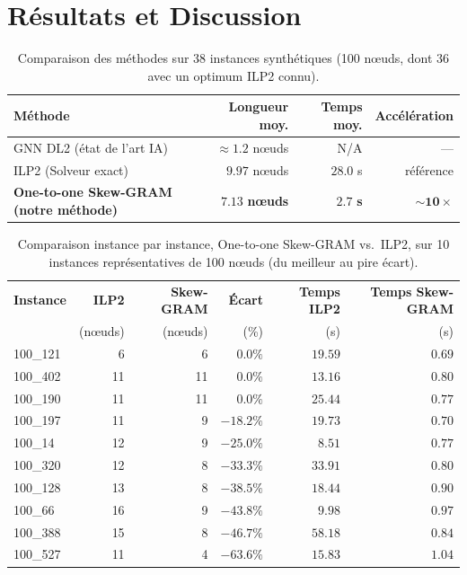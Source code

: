 \documentclass{llncs}
\begin{document}
\section{Résultats et Discussion}

\begin{table}[htbp]
\centering
\caption{Comparaison des méthodes sur 38 instances synthétiques (100 nœuds, dont 36 avec un optimum ILP2 connu).}
\label{tab:results}
\begin{tabular}{lrrr}
\toprule
\textbf{Méthode} & \textbf{Longueur moy.} & \textbf{Temps moy.} & \textbf{Accélération} \\
\midrule
GNN DL2 \cite{sidi} (état de l'art IA) & $\approx 1.2$ nœuds & N/A & — \\
ILP2 \cite{sidi} (Solveur exact) & $9.97$ nœuds & $28.0$ s & référence \\
\textbf{One-to-one Skew-GRAM (notre méthode)} & $\mathbf{7.13}$ \textbf{nœuds} & $\mathbf{2.7}$ \textbf{s} & $\mathbf{\sim 10\times}$ \\
\bottomrule
\end{tabular}
\end{table}

\begin{table}[htbp]
\centering
\caption{Comparaison instance par instance, One-to-one Skew-GRAM vs.\ ILP2, sur 10 instances représentatives de 100 nœuds (du meilleur au pire écart).}
\label{tab:per-instance}
\begin{tabular}{lrrrrr}
\toprule
\textbf{Instance} & \textbf{ILP2} & \textbf{Skew-GRAM} & \textbf{Écart} & \textbf{Temps ILP2} & \textbf{Temps Skew-GRAM} \\
 & (nœuds) & (nœuds) & (\%) & (s) & (s) \\
\midrule
100\_121 & 6  & 6  & $0.0\%$   & $19.59$ & $0.69$ \\
100\_402 & 11 & 11 & $0.0\%$   & $13.16$ & $0.80$ \\
100\_190 & 11 & 11 & $0.0\%$   & $25.44$ & $0.77$ \\
100\_197 & 11 & 9  & $-18.2\%$ & $19.73$ & $0.70$ \\
100\_14  & 12 & 9  & $-25.0\%$ & $8.51$  & $0.77$ \\
100\_320 & 12 & 8  & $-33.3\%$ & $33.91$ & $0.80$ \\
100\_128 & 13 & 8  & $-38.5\%$ & $18.44$ & $0.90$ \\
100\_66  & 16 & 9  & $-43.8\%$ & $9.98$  & $0.97$ \\
100\_388 & 15 & 8  & $-46.7\%$ & $58.18$ & $0.84$ \\
100\_527 & 11 & 4  & $-63.6\%$ & $15.83$ & $1.04$ \\
\bottomrule
\end{tabular}
\end{table}
\end{document}
